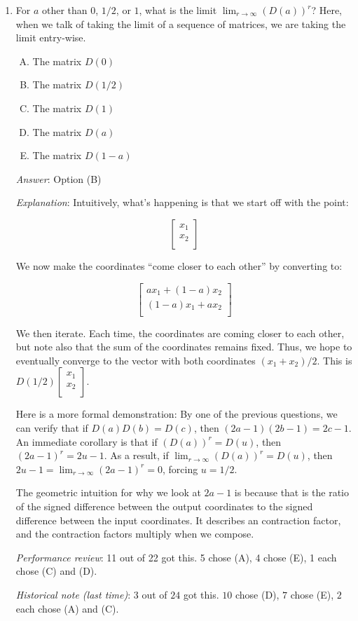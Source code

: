\documentclass[10pt]{amsart}
\begin{document}
\begin{enumerate}
\item For $a$ other than $0$, $1/2$, or $1$, what is the limit
  $\lim_{r \to \infty} (D(a))^r$? Here, when we talk of taking the
  limit of a sequence of matrices, we are taking the limit entry-wise.

  \begin{enumerate}[(A)]
  \item The matrix $D(0)$
  \item The matrix $D(1/2)$
  \item The matrix $D(1)$
  \item The matrix $D(a)$
  \item The matrix $D(1 - a)$
  \end{enumerate}

  {\em Answer}: Option (B)

  {\em Explanation}: Intuitively, what's happening is that we start
  off with the point:

  $$\left[\begin{matrix} x_1 \\ x_2 \\\end{matrix}\right]$$
  
  We now make the coordinates ``come closer to each other'' by converting to:

  $$\left[\begin{matrix} ax_1 + (1 - a)x_2 \\ (1 - a)x_1 + ax_2 \\\end{matrix}\right]$$

  We then iterate. Each time, the coordinates are coming closer to
  each other, but note also that the sum of the coordinates remains
  fixed. Thus, we hope to eventually converge to the vector with both
  coordinates $(x_1 + x_2)/2$. This is $D(1/2)\left[\begin{matrix} x_1
      \\ x_2 \\\end{matrix}\right]$.

  Here is a more formal demonstration: By one of the previous
  questions, we can verify that if $D(a)D(b) = D(c)$, then $(2a -
  1)(2b - 1) = 2c - 1$. An immediate corollary is that if $(D(a))^r =
  D(u)$, then $(2a - 1)^r = 2u - 1$. As a result, if $\lim_{r \to
    \infty} (D(a))^r = D(u)$, then $2u - 1 = \lim_{r \to \infty} (2a -
  1)^r =0$, forcing $u = 1/2$.

  The geometric intuition for why we look at $2a - 1$ is because that
  is the ratio of the signed difference between the output coordinates
  to the signed difference between the input coordinates. It describes
  an contraction factor, and the contraction factors multiply when we
  compose.

  {\em Performance review}: 11 out of 22 got this. 5 chose (A), 4
  chose (E), 1 each chose (C) and (D).

  {\em Historical note (last time)}: $3$ out of $24$ got this. $10$ chose (D),
  $7$ chose (E), $2$ each chose (A) and (C).

\end{enumerate}
\end{document}

